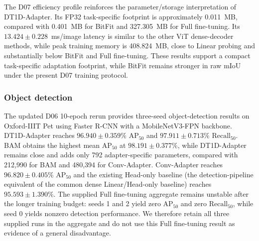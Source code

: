 \documentclass[pdflatex,sn-mathphys-num]{sn-jnl}
\theoremstyle{thmstyleone}
\theoremstyle{thmstyletwo}
\theoremstyle{thmstylethree}
\begin{document}
The D07 efficiency profile reinforces the parameter/storage interpretation of DT1D-Adapter. Its FP32 task-specific footprint is approximately 0.011~MB, compared with 0.401~MB for BitFit and 327.305~MB for Full fine-tuning. Its $13.424\pm0.228$~ms/image latency is similar to the other ViT dense-decoder methods, while peak training memory is 408.824~MB, close to Linear probing and substantially below BitFit and Full fine-tuning. These results support a compact task-specific adaptation footprint, while BitFit remains stronger in raw mIoU under the present D07 training protocol.

\subsubsection{Object detection}

The updated D06 10-epoch rerun provides three-seed object-detection results on Oxford-IIIT Pet using Faster R-CNN with a MobileNetV3-FPN backbone. DT1D-Adapter reaches $96.940\pm0.359\%$ $\mathrm{AP}_{50}$ and $97.911\pm0.713\%$ $\mathrm{Recall}_{50}$. BAM obtains the highest mean $\mathrm{AP}_{50}$ at $98.191\pm0.377\%$, while DT1D-Adapter remains close and adds only 792 adapter-specific parameters, compared with 212,990 for BAM and 480,394 for Conv-Adapter. Conv-Adapter reaches $96.820\pm0.405\%$ $\mathrm{AP}_{50}$ and the existing Head-only baseline (the detection-pipeline equivalent of the common dense Linear/Head-only baseline) reaches $95.593\pm1.390\%$. The supplied Full fine-tuning aggregate remains unstable after the longer training budget: seeds 1 and 2 yield zero $\mathrm{AP}_{50}$ and zero $\mathrm{Recall}_{50}$, while seed 0 yields nonzero detection performance. We therefore retain all three supplied runs in the aggregate and do not use this Full fine-tuning result as evidence of a general disadvantage.
\end{document}

